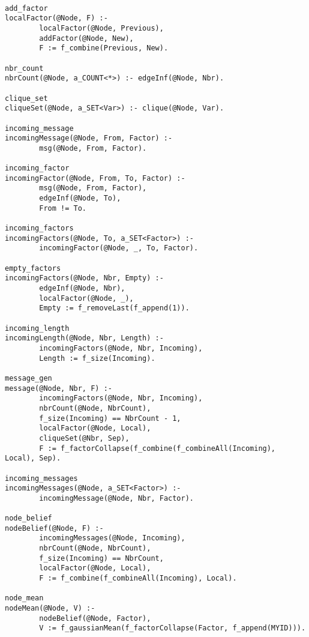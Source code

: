 \begin{figure*}[tpb]
\tt
{\begin{lstlisting}[frame=trbl, caption={Shafer Shenoy algorithm rules},
label=ssrules, captionpos=b, basicstyle=\footnotesize, boxpos=c]
add_factor
localFactor(@Node, F) :-
        localFactor(@Node, Previous),
        addFactor(@Node, New),
        F := f_combine(Previous, New).

nbr_count
nbrCount(@Node, a_COUNT<*>) :- edgeInf(@Node, Nbr).

clique_set
cliqueSet(@Node, a_SET<Var>) :- clique(@Node, Var).

incoming_message
incomingMessage(@Node, From, Factor) :-
        msg(@Node, From, Factor).

incoming_factor
incomingFactor(@Node, From, To, Factor) :-
        msg(@Node, From, Factor),
        edgeInf(@Node, To),
        From != To.

incoming_factors
incomingFactors(@Node, To, a_SET<Factor>) :-
        incomingFactor(@Node, _, To, Factor).

empty_factors
incomingFactors(@Node, Nbr, Empty) :- 
        edgeInf(@Node, Nbr),
        localFactor(@Node, _),
        Empty := f_removeLast(f_append(1)).

incoming_length
incomingLength(@Node, Nbr, Length) :- 
        incomingFactors(@Node, Nbr, Incoming),
        Length := f_size(Incoming).

message_gen
message(@Node, Nbr, F) :-
        incomingFactors(@Node, Nbr, Incoming),
        nbrCount(@Node, NbrCount),
        f_size(Incoming) == NbrCount - 1,
        localFactor(@Node, Local),
        cliqueSet(@Nbr, Sep),
        F := f_factorCollapse(f_combine(f_combineAll(Incoming), Local), Sep).

incoming_messages
incomingMessages(@Node, a_SET<Factor>) :-
        incomingMessage(@Node, Nbr, Factor).

node_belief
nodeBelief(@Node, F) :-
        incomingMessages(@Node, Incoming),
        nbrCount(@Node, NbrCount),
        f_size(Incoming) == NbrCount,
        localFactor(@Node, Local),
        F := f_combine(f_combineAll(Incoming), Local).

node_mean
nodeMean(@Node, V) :-
        nodeBelief(@Node, Factor),
        V := f_gaussianMean(f_factorCollapse(Factor, f_append(MYID))).

\end{lstlisting}
}
\end{figure*}